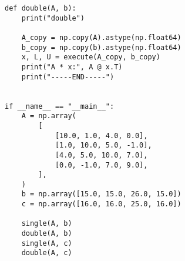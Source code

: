 \documentclass{jsarticle}
\begin{document}
\begin{lstlisting}[caption=スクリプトファイル名,label=参照ラベル]
def double(A, b):
    print("double")

    A_copy = np.copy(A).astype(np.float64)
    b_copy = np.copy(b).astype(np.float64)
    x, L, U = execute(A_copy, b_copy)
    print("A * x:", A @ x.T)
    print("-----END-----")


if __name__ == "__main__":
    A = np.array(
        [
            [10.0, 1.0, 4.0, 0.0],
            [1.0, 10.0, 5.0, -1.0],
            [4.0, 5.0, 10.0, 7.0],
            [0.0, -1.0, 7.0, 9.0],
        ],
    )
    b = np.array([15.0, 15.0, 26.0, 15.0])
    c = np.array([16.0, 16.0, 25.0, 16.0])

    single(A, b)
    double(A, b)
    single(A, c)
    double(A, c)

\end{lstlisting}
\begin{lstlisting}[caption=スクリプトファイル名,label=参照ラベル]
\end{lstlisting}


\end{document}
